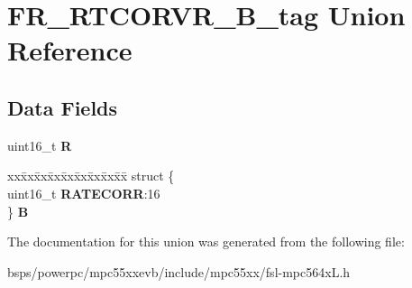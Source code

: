 \hypertarget{unionFR__RTCORVR__16B__tag}{}\section{F\+R\+\_\+\+R\+T\+C\+O\+R\+V\+R\+\_\+B\+\_\+tag Union Reference}
\label{unionFR__RTCORVR__16B__tag}
\subsection*{Data Fields}
\begin{DoxyCompactItemize}
\item 
\mbox{\label{unionFR__RTCORVR__16B__tag_a5f94a1610f776aaec4064dabe6a3a46d}} 
uint16\+\_\+t {\bfseries R}
\item 
\mbox{\label{unionFR__RTCORVR__16B__tag_ac2d54528956e27b1ff09ddd527de5bb3}} 
\begin{tabbing}
xx\=xx\=xx\=xx\=xx\=xx\=xx\=xx\=xx\=\kill
struct \{\\
\>uint16\_t {\bfseries RATECORR}:16\\
\} {\bfseries B}\\

\end{tabbing}\end{DoxyCompactItemize}


The documentation for this union was generated from the following file\+:\begin{DoxyCompactItemize}
\item 
bsps/powerpc/mpc55xxevb/include/mpc55xx/fsl-\/mpc564x\+L.\+h\end{DoxyCompactItemize}
